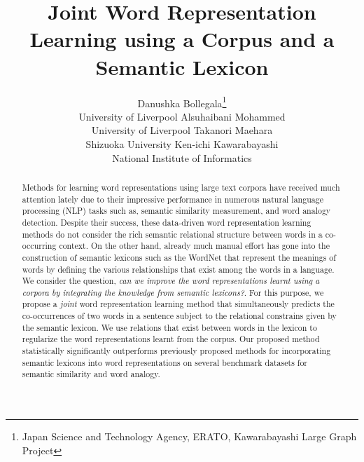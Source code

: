 \documentclass[letterpaper]{article}
\begin{document}
%
\title{Joint Word  Representation Learning using a Corpus and a Semantic Lexicon}


\author{Danushka Bollegala\thanks{Japan Science and Technology Agency, ERATO, Kawarabayashi Large Graph Project} \\ University of Liverpool \And
 Alsuhaibani Mohammed \\ University of Liverpool \And
Takanori Maehara\footnotemark[1] \\
Shizuoka University  \And
Ken-ichi Kawarabayashi\footnotemark[1] \\
National Institute of Informatics}


\maketitle
\begin{abstract}
Methods for learning word representations using large text corpora have received much attention lately due to their impressive performance
in numerous natural language processing (NLP) tasks such as, semantic similarity measurement, and word analogy detection.
Despite their success, these data-driven word representation learning methods do not consider
the rich semantic relational structure between words in a co-occurring context.
On the other hand, already much manual effort has gone into the construction of semantic lexicons such as the WordNet
that represent the meanings of words by defining the various relationships that exist among the words in a language.
We consider the question, \emph{can we improve the word representations learnt using a corpora by integrating the
knowledge from semantic lexicons?}. For this purpose, we propose a \emph{joint} word representation learning method that simultaneously predicts
the co-occurrences of two words in a sentence subject to the relational constrains given by the semantic lexicon.
We use relations that exist between words in the lexicon to regularize the word representations learnt from the corpus.
Our proposed method statistically significantly outperforms previously proposed methods for incorporating semantic lexicons into word
representations on several benchmark datasets for semantic similarity and word analogy.
\end{abstract}
\end{document}
